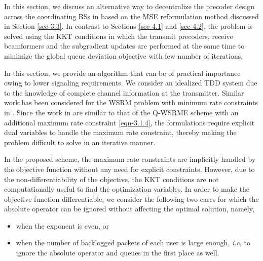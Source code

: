 In this section, we discuss an alternative way to decentralize the precoder design across the coordinating \acp{BS} in  based on the \ac{MSE} reformulation method discussed in Section \ref{sec-3.3}. In contrast to Sections \ref{sec-4.1} and \ref{sec-4.2}, the problem is solved using the \ac{KKT} conditions in which the transmit precoders, receive beamformers and the subgradient updates are performed at the same time to minimize the global queue deviation objective with few number of iterations. 

In this section, we provide an algorithm that can be of practical importance owing to lower signaling requirements. We consider an idealized \ac{TDD} system due to the knowledge of complete channel information at the transmitter. Similar work has been considered for the \ac{WSRM} problem with minimum rate constraints in \cite{kaleva2013decentralized,kaleva2013primal}. Since the work in \cite{kaleva2013decentralized,kaleva2013primal} are similar to that of the \ac{Q-WSRME} scheme with an additional maximum rate constraint \eqref{eqn-3.1.4}, the formulations require explicit dual variables to handle the maximum rate constraint, thereby making the problem difficult to solve in an iterative manner.

In the proposed scheme, the maximum rate constraints are implicitly handled by the objective function without any need for explicit constraints. However, due to the non-differentiability of the objective, the \ac{KKT} conditions are not computationally useful to find the optimization variables. In order to make the objective function differentiable, we consider the following two cases for which the absolute operator can be ignored without affecting the optimal solution, namely,
\begin{itemize}
\item when the exponent  is even, or
\item when the number of backlogged packets of each user is large enough, \textit{i.e},  to ignore the absolute operator and queues in the first place as well.
\end{itemize}

